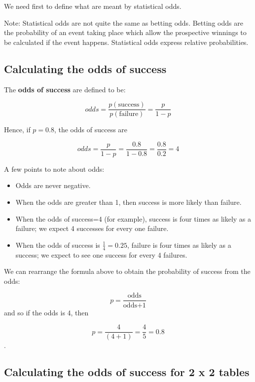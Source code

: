 \documentclass[
  oneside]{krantz}
\providecommand{\tightlist}{%
  \setlength{\itemsep}{0pt}\setlength{\parskip}{0pt}}
\begin{document}
We need first to define what are meant by statistical odds.

Note: Statistical odds are not quite the same as betting odds. Betting odds are the probability of an event taking place which allow the prospective winnings to be calculated if the event happens. Statistical odds express relative probabilities.

\hypertarget{calculating-the-odds-of-success}{%
\subsection{Calculating the odds of success}\label{calculating-the-odds-of-success}}

The \textbf{odds of success} are defined to be:

\[odds=\frac{p(\textrm{success})}{p(\textrm{failure})} = \frac{p}{1-p}\]

Hence, if \(p=0.8\), the odds of success are

\[odds=\frac{p}{1-p}=\frac{0.8}{1-0.8}=\frac{0.8}{0.2}=4\]

A few points to note about odds:

\begin{itemize}
\tightlist
\item
  Odds are never negative.
\item
  When the odds are greater than 1, then success is more likely than failure.
\item
  When the odds of success=4 (for example), success is four times as likely as a failure; we expect 4 successes for every one failure.
\item
  When the odds of success is \(\frac{1}{4}=0.25\), failure is four times as likely as a success; we expect to see one success for every 4 failures.
\end{itemize}

We can rearrange the formula above to obtain the probability of success from the odds:

\[p=\frac{\textrm{odds}}{\textrm{odds+1}}\]
and so if the odds is 4, then

\[p=\frac{4}{(4+1)}=\frac{4}{5}=0.8\].

\hypertarget{calculating-the-odds-of-success-for-2-x-2-tables}{%
\subsection{Calculating the odds of success for 2 x 2 tables}\label{calculating-the-odds-of-success-for-2-x-2-tables}}
\end{document}
